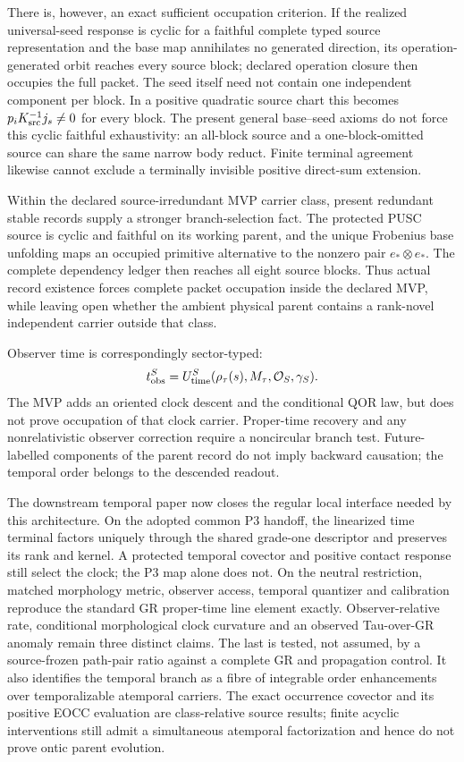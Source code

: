 \documentclass[11pt]{article}
\newcommand{\Rmap}{\rho_{\tau}}
\newcommand{\Mta}{M_{\tau}}
\begin{document}
There is, however, an exact sufficient occupation criterion. If the realized
universal-seed response is cyclic for a faithful complete typed source
representation and the base map annihilates no generated direction, its
operation-generated orbit reaches every source block; declared operation
closure then occupies the full packet. The seed itself need not contain one
independent component per block. In a positive quadratic source chart this becomes
$p_iK_{\rm src}^{-1}j_s\ne0$ for every block. The present general base--seed
axioms do not force this cyclic faithful exhaustivity: an all-block source and
a one-block-omitted source can share the same narrow body reduct. Finite
terminal agreement likewise cannot exclude a terminally invisible positive
direct-sum extension.

Within the declared source-irredundant MVP carrier class, present redundant
stable records supply a stronger branch-selection fact. The protected PUSC
source is cyclic and faithful on its working parent, and the unique Frobenius
base unfolding maps an occupied primitive alternative to the nonzero pair
$e_*\otimes e_*$. The complete dependency ledger then reaches all eight
source blocks. Thus actual record existence forces complete packet occupation
inside the declared MVP, while leaving open whether the ambient physical
parent contains a rank-novel independent carrier outside that class.

Observer time is correspondingly sector-typed:
\begin{equation}
 t_{\rm obs}^{S}
 =U_{\rm time}^{S}(\Rmap(s),\Mta,\mathcal O_S,\gamma_S).
 \label{eq:observer-time}
\end{equation}
The MVP adds an oriented clock descent and the conditional QOR law, but does
not prove occupation of that clock carrier.  Proper-time recovery and any
nonrelativistic observer correction require a noncircular branch test.
Future-labelled components of the parent record do not imply backward
causation; the temporal order belongs to the descended readout.

The downstream temporal paper now closes the regular local interface needed
by this architecture. On the adopted common P3 handoff, the linearized time
terminal factors uniquely through the shared grade-one descriptor and
preserves its rank and kernel. A protected temporal covector and positive
contact response still select the clock; the P3 map alone does not. On the
neutral restriction, matched morphology metric, observer access, temporal
quantizer and calibration reproduce the standard GR proper-time line element
exactly. Observer-relative rate, conditional morphological clock curvature
and an observed Tau-over-GR anomaly remain three distinct claims. The last is
tested, not assumed, by a source-frozen path-pair ratio against a complete GR
and propagation control.
It also identifies the temporal branch as a fibre of integrable order
enhancements over temporalizable atemporal carriers.  The exact occurrence
covector and its positive EOCC evaluation are class-relative source results;
finite acyclic interventions still admit a simultaneous atemporal
factorization and hence do not prove ontic parent evolution.
\end{document}
